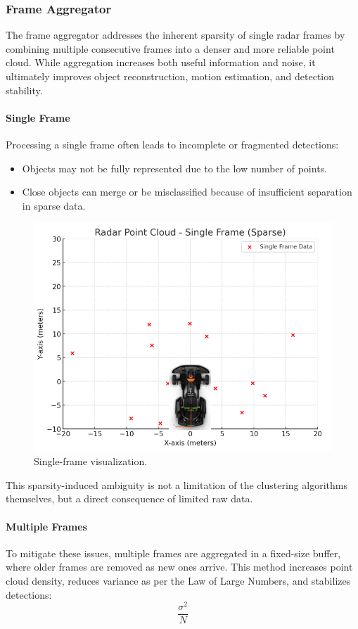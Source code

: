 \vspace{0.5em}
\subsubsection{Frame Aggregator}  
The frame aggregator addresses the inherent sparsity of single radar frames by combining multiple consecutive frames into a denser and more reliable point cloud.  
While aggregation increases both useful information and noise, it ultimately improves object reconstruction, motion estimation, and detection stability.

\paragraph{Single Frame}
Processing a single frame often leads to incomplete or fragmented detections:
\begin{itemize}
    \item Objects may not be fully represented due to the low number of points.
    \item Close objects can merge or be misclassified because of insufficient separation in sparse data.
\end{itemize}

\begin{figure}[!htbp]
    \centering
    \includegraphics[width=0.5\linewidth]{images/singleframe.png}
    \caption{Single-frame visualization.}
    \label{fig:single_frame}
\end{figure}

This sparsity-induced ambiguity is not a limitation of the clustering algorithms themselves, but a direct consequence of limited raw data.

\paragraph{Multiple Frames}
To mitigate these issues, multiple frames are aggregated in a fixed-size buffer, where older frames are removed as new ones arrive.  
This method increases point cloud density, reduces variance as per the Law of Large Numbers, and stabilizes detections:
\begin{equation}
    \frac{\sigma^2}{N}
    \label{eq:variance_per_sample_size}
\end{equation}


